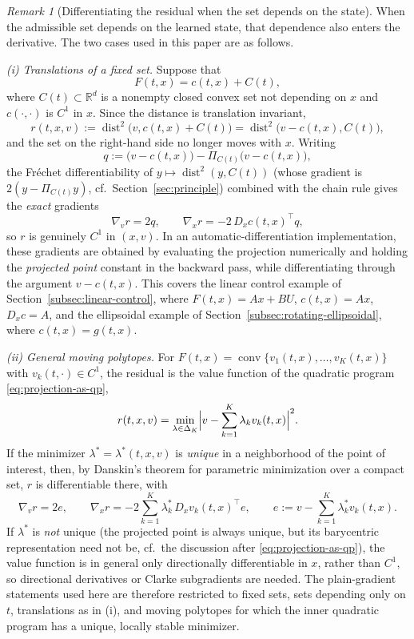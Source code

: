 \documentclass[11pt]{elsarticle}
\theoremstyle{definition}
\theoremstyle{remark}
\newtheorem{remark}[theorem]{Remark}
\numberwithin{equation}{section}
\def\dist{\operatorname{dist}}
\begin{document}
	\begin{remark}[Differentiating the residual when the set depends on the
		state]\label{rem:moving-set-gradient}
		When the admissible set depends on the learned state, that dependence
		also enters the derivative. The two cases used in this paper are as
		follows.
		
		\emph{(i) Translations of a fixed set.} Suppose that
		\[
		F(t,x)=c(t,x)+C(t),
		\]
		where $C(t)\subset\mathbb{R}^d$ is a nonempty closed convex set not
		depending on $x$ and $c(\cdot,\cdot)$ is $C^1$ in $x$. Since the
		distance is translation invariant,
		\[
		r(t,x,v):=\dist^2\bigl(v,c(t,x)+C(t)\bigr)
		=\dist^2\bigl(v-c(t,x),C(t)\bigr),
		\]
		and the set on the right-hand side no longer moves with $x$.
		Writing 
		\[
		q:=\bigl(v-c(t,x)\bigr)-\Pi_{C(t)}\bigl(v-c(t,x)\bigr),
		\]
		the Fr\'echet differentiability of $y\mapsto\dist^2(y,C(t))$ (whose
		gradient is $2(y-\Pi_{C(t)}y)$, cf.\ Section~\ref{sec:principle})
		combined with the chain rule gives the \emph{exact} gradients
		\[
		\nabla_v r=2q,
		\qquad
		\nabla_x r=-2\,D_xc(t,x)^{\!\top}q,
		\]
		so $r$ is genuinely $C^1$ in $(x,v)$. In an automatic-differentiation
		implementation, these gradients are obtained by evaluating the
		projection numerically and holding the \emph{projected point}
		constant in the backward pass, while differentiating through the
		argument $v-c(t,x)$. This covers the linear control example of
		Section~\ref{subsec:linear-control}, where
		$F(t,x)=Ax+BU$, $c(t,x)=Ax$, $D_xc=A$, and the ellipsoidal example
		of Section~\ref{subsec:rotating-ellipsoidal}, where $c(t,x)=g(t,x)$.
		
		\emph{(ii) General moving polytopes.} For
		$F(t,x)=\operatorname{conv}\{v_1(t,x),\dots,v_K(t,x)\}$ with
		$v_k(t,\cdot)\in C^1$, the residual is the value function of the
		quadratic program \eqref{eq:projection-as-qp},
		\[
		r(t,x,v)
		=\min_{\lambda\in\Delta_K}
		\Bigl|v-\sum_{k=1}^K\lambda_kv_k(t,x)\Bigr|^2 .
		\]
		If the minimizer $\lambda^\ast=\lambda^\ast(t,x,v)$ is \emph{unique}
		in a neighborhood of the point of interest, then, by Danskin's
		theorem for parametric minimization over a compact set, $r$ is
		differentiable there, with
		\[
		\nabla_vr=2e,
		\qquad
		\nabla_xr=-2\sum_{k=1}^K\lambda_k^\ast\,
		D_xv_k(t,x)^{\!\top}e,
		\qquad
		e:=v-\sum_{k=1}^K\lambda_k^\ast v_k(t,x).
		\]
		If $\lambda^\ast$ is \emph{not} unique (the projected point is
		always unique, but its barycentric representation need not be, cf.\
		the discussion after \eqref{eq:projection-as-qp}), the value function
		is in general only directionally differentiable in $x$, rather than
		$C^1$, so directional derivatives or Clarke subgradients are needed. The plain-gradient statements used here are therefore restricted to fixed sets, sets
		depending only on $t$, translations as in (i), and moving polytopes for
		which the inner quadratic program has a unique, locally stable
		minimizer.
	\end{remark}
	
\end{document}
